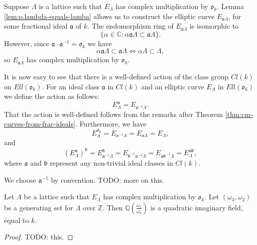 Suppose $\Lambda$ is a lattice such that $E_{\Lambda}$ has complex multiplication by
$\mathfrak{o}_{k}$.  Lemma \ref{lem:o.lambda-equals-lamba} allows us to construct the
elliptic curve $E_{\mathfrak{a}\Lambda}$, for some fractional ideal $\mathfrak{a}$ of
$k$.  The endomorphism ring of $E_{\mathfrak{a}\Lambda}$ is isomorphic to
\begin{equation*}
  \{\alpha \in \mathbb{C} : \alpha \mathfrak{a}\Lambda \subset \mathfrak{a}\Lambda \}.
\end{equation*}
However, since $\mathfrak{a} \cdot \mathfrak{a}^{-1} = \mathfrak{o}_{k}$ we have
\begin{equation*}
  \alpha \mathfrak{a}\Lambda \subset \mathfrak{a}\Lambda
  \Leftrightarrow
  \alpha\Lambda \subset \Lambda ,
\end{equation*}
so $E_{\mathfrak{a}\Lambda}$ has complex multiplication by $\mathfrak{o}_{k}$.

It is now easy to see that there is a well-defined action of the class group $Cl(k)$
on $Ell(\mathfrak{o}_{k})$.  For an ideal class $\mathfrak{a}$ in $Cl(k)$ and an
elliptic curve $E_{\Lambda}$ in $Ell(\mathfrak{o}_{k})$ we define the action as
follows:
\begin{equation*}
  E_{\Lambda}^{\mathfrak{a}} = E_{\mathfrak{a}^{-1}\Lambda}.
\end{equation*}
That the action is well-defined follows from the remarks after Theorem
\ref{thm:cm-curves-from-frac-ideals}.  Furthermore, we have
\begin{equation*}
  E_{\Lambda}^{\mathfrak{o}_{k}} = E_{\mathfrak{o}^{-1}\Lambda} =
  E_{\mathfrak{o}\Lambda} = E_{\Lambda},
\end{equation*}
and
\begin{equation*}
  (E_{\Lambda}^{\mathfrak{a}})^{\mathfrak{b}} =
  E_{\mathfrak{a}^{-1}\Lambda}^{\mathfrak{b}} =
  E_{\mathfrak{b}^{-1}\mathfrak{a}^{-1}\Lambda} = E_{\mathfrak{ab}^{-1}\Lambda} = E_{\Lambda}^{\mathfrak{ab}},
\end{equation*}
where $\mathfrak{a}$ and $\mathfrak{b}$ represent any non-trivial ideal classes in
$Cl(k)$.
\begin{rem}
  \label{rem:convention-on-group-action}
  We choose $\mathfrak{a}^{-1}$ by convention. TODO: more on this.
\end{rem}

\begin{lem}
  \label{lem:Q-adjoin-w1-over-w2-is-quadratic-imaginary}
  Let $\Lambda$ be a lattice such that $E_{\Lambda}$ has complex multiplication by
  $\mathfrak{o}_{k}$.  Let $(\omega_{1},\omega_{2})$ be a generating set for
  $\Lambda$ over $\mathbb{Z}$.  Then $\mathbb{Q}(\frac{\omega_{1}}{\omega_{2}})$ is a
  quadratic imaginary field, equal to $k$.
\end{lem}
\begin{proof}
  TODO: this.
\end{proof}


